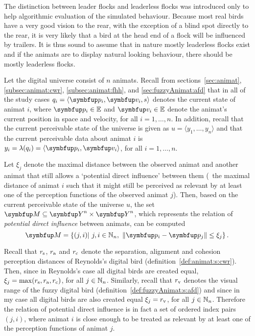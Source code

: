 The distinction between leader flocks and leaderless flocks was introduced only to help algorithmic evaluation of the simulated behaviour. Because most real birds have a very good vision to the rear, with the exception of a blind spot directly to the rear, it is very likely that a bird at the head end of a flock will be influenced by trailers. It is thus sound to assume that in nature mostly leaderless flocks exist and if the animats are to display natural looking behaviour, there should be mostly leaderless flocks.

Let the digital universe consist of $n$ animats. Recall from sections~\ref{sec:animat}, \ref{subsec:animat:cwr}, \ref{subsec:animat:fhh}, and \ref{sec:fuzzyAnimat:afd} that in all of the study cases $q_i=\langle \vect{p}_i, \vect{v}_i, s \rangle$ denotes the current state of animat $i$, where $\vect{p}_i \in \E$ and $\vect{v}_i \in \E$ denote the animat's current position in space and velocity, for all $i=1,\ldots,n$. In addition, recall that the current perceivable state of the universe is given as $u=\langle y_1,\ldots,y_n\rangle$ and that the current perceivable data about animat $i$ is $y_i=\lambda(q_i)=\langle\vect{p}_i,\vect{v}_i\rangle$, for all $i=1,\ldots,n$.

Let $\xi_j$ denote the maximal distance between the observed animat and another animat that still allows a `potential direct influence' between them (\ie\ the maximal distance of animat $i$ such that it might still be perceived as relevant by at least one of the perception functions of the observed animat $j$). Then, based on the current perceivable state of the universe $u$, the set $\set{M} \subseteq \set{Y}^n \times \set{Y}^n$, which represents the relation of \emph{potential direct influence} between animats, can be computed
%
\begin{equation}
  \set{M}=\left\{ (j,i)|\ j, i \in \N_n,\ \left\|\vect{p}_i-\vect{p}_j\right\| \leq \xi_j \right\}. \label{eq:metric:M}
\end{equation}

Recall that $r_\textnormal{s}$, $r_\textnormal{a}$ and $r_\textnormal{c}$ denote the separation, alignment and cohesion perception distances of Reynolds's digital bird (definition~\ref{def:animat:s:cwr}). Then, since in Reynolds's case all digital birds are created equal, $\xi_j=\max(r_\textnormal{s},r_\textnormal{a},r_\textnormal{c})$, for all $j \in \mathbb{N}_n$. Similarly, recall that $r_\textnormal{v}$ denotes the visual range of the fuzzy digital bird (definition~\ref{def:fuzzyAnimat:s:afd}) and since in my case all digital birds are also created equal $\xi_j=r_\textnormal{v}$, for all $j \in \mathbb{N}_n$. Therefore the relation of potential direct influence is in fact a set of ordered index pairs $(j,i)$, where animat $i$ is close enough to be treated as relevant by at least one of the perception functions of animat $j$.

